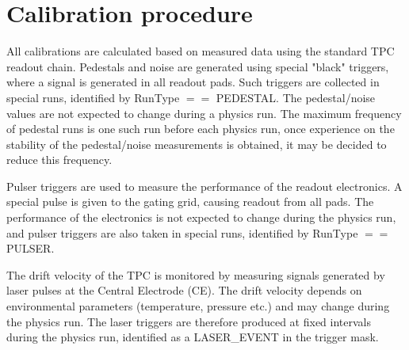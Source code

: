 \documentclass[a4paper,12pt]{article}
\begin{document}
\section{Calibration procedure}
All calibrations are calculated based on measured data using the standard TPC
readout chain. Pedestals and noise are generated using special "black" triggers,
where a signal is generated in all readout pads. Such triggers are collected in
special runs, identified by RunType $==$ PEDESTAL. The pedestal/noise values are not expected to change during a physics run. The maximum frequency of pedestal runs is one such run before each physics run, once experience on the stability of the pedestal/noise measurements is obtained, it may be decided to reduce this frequency. 

Pulser triggers are used to measure the performance of the readout electronics.
A special pulse is given to the gating grid, causing readout from all pads. The
performance of the electronics is not expected to change during the physics run,
and pulser triggers are also taken in special runs, identified by RunType $==$ 
PULSER.

The drift velocity of the TPC is monitored by measuring signals generated by
laser pulses at the Central Electrode (CE). The drift velocity depends on
environmental parameters (temperature, pressure etc.) and may change during
the physics run. The laser triggers are therefore produced at fixed intervals
during the physics run, identified as a LASER\_EVENT in the trigger mask. 
\end{document}
